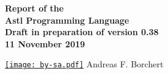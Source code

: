 \begin{titlepage}
   \begin{flushright}
      {\Huge \bfseries
	 Report of the \\
	 Astl Programming Language \\
	 Draft in preparation of version 0.38 \\
	 11 November 2019 \\
      }

      \vspace*{\fill}

      \href{https://creativecommons.org/licenses/by-sa/4.0/}
      {\texttt{[image: by-sa.pdf]}}
      \hspace*{\fill}
      {\huge
	 Andreas F. Borchert \\
      }
   \end{flushright}
\end{titlepage}
